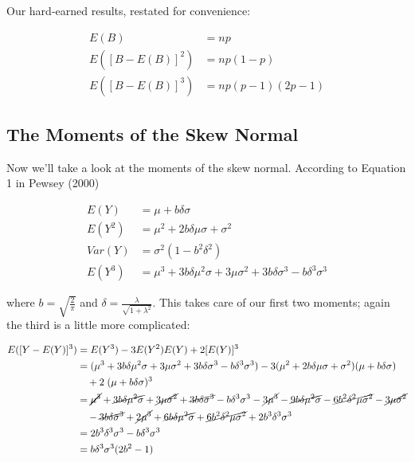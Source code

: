 \documentclass{article}
\begin{document}
Our hard-earned results, restated for convenience:

\begin{align}
  E(B) &= np \nonumber \\
  E([B - E(B)]^2) &= np(1-p) \\
  E([B - E(B)]^3) &= np(p-1)(2p-1) \nonumber
\end{align}

\subsection{The Moments of the Skew Normal}

Now we'll take a look at the moments of the skew normal. According to Equation
1 in Pewsey (2000)

\begin{align*}
  E(Y) &= \mu + b \delta \sigma \\
  E(Y^2) &= \mu^2 + 2b \delta \mu \sigma + \sigma^2 \\
  Var(Y) &= \sigma^2 (1 - b^2 \delta^2) \\
  E(Y^3) &= \mu^3 + 3 b \delta \mu^2 \sigma + 3 \mu \sigma^2 + 3 b \delta \sigma^3 - b \delta^3 \sigma^3 \nonumber
\end{align*}

where $b = \sqrt{\frac{2}{\pi}}$ and $\delta = \frac{\lambda}{\sqrt{1 +
\lambda^2}}$. This takes care of our first two moments; again the third is a
little more complicated:

\begin{align*}
  E([Y - E(Y)]^3) &= E(Y^3) - 3E(Y^2)E(Y) + 2[E(Y)]^3 \\
  &= (\mu^3 + 3 b \delta \mu^2 \sigma + 3 \mu \sigma^2 + 3 b \delta \sigma^3 - b \delta^3 \sigma^3) - 3 (\mu^2 + 2b \delta \mu \sigma + \sigma^2) (\mu + b \delta \sigma) \\
  & \quad + 2\;(\mu + b \delta \sigma)^3 \\
  &= \cancel{\mu^3} + \cancel{3 b \delta \mu^2 \sigma} + \cancel{3 \mu \sigma^2} + \cancel{3 b \delta \sigma^3} - b \delta^3 \sigma^3 - \cancel{3 \mu^3} - \cancel{9 b \delta \mu^2 \sigma} -
    \cancel{6 b^2 \delta^2 \mu \sigma^2} - \cancel{3 \mu \sigma^2} \\
  & \quad - \cancel{3 b \delta \sigma^3} + \cancel{2 \mu^3} + \cancel{6 b \delta \mu^2 \sigma} + \cancel{6 b^2 \delta^2 \mu \sigma^2} + 2 b^3 \delta^3 \sigma^3 \\
  &= 2 b^3 \delta^3 \sigma^3 - b \delta^3 \sigma^3 \\
  &= b \delta^3 \sigma^3 (2b^2 - 1)
\end{align*}
\end{document}
